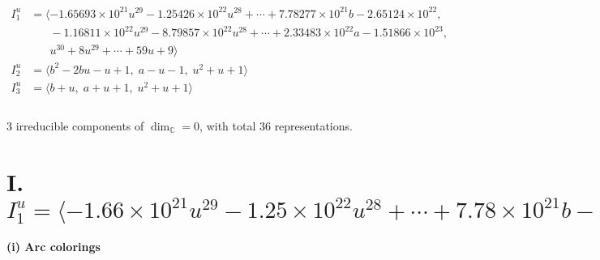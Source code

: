 \documentclass[1p]{elsarticle_modified}
\theoremstyle{definition}
\begin{document}
\begin{align*}
I^u_{1}&=\langle 
-1.65693\times10^{21} u^{29}-1.25426\times10^{22} u^{28}+\cdots+7.78277\times10^{21} b-2.65124\times10^{22},\\
\phantom{I^u_{1}}&\phantom{= \langle  }-1.16811\times10^{22} u^{29}-8.79857\times10^{22} u^{28}+\cdots+2.33483\times10^{22} a-1.51866\times10^{23},\\
\phantom{I^u_{1}}&\phantom{= \langle  }u^{30}+8 u^{29}+\cdots+59 u+9\rangle \\
I^u_{2}&=\langle 
b^2-2 b u- u+1,\;a- u-1,\;u^2+u+1\rangle \\
I^u_{3}&=\langle 
b+u,\;a+u+1,\;u^2+u+1\rangle \\
\\
\end{align*}
\raggedright * 3 irreducible components of $\dim_{\mathbb{C}}=0$, with total 36 representations.\\
\newpage
\renewcommand{\arraystretch}{1}
\centering \section*{I. $I^u_{1}= \langle -1.66\times10^{21} u^{29}-1.25\times10^{22} u^{28}+\cdots+7.78\times10^{21} b-2.65\times10^{22},\;-1.17\times10^{22} u^{29}-8.80\times10^{22} u^{28}+\cdots+2.33\times10^{22} a-1.52\times10^{23},\;u^{30}+8 u^{29}+\cdots+59 u+9 \rangle$}
\flushleft \textbf{(i) Arc colorings}\\
\end{document}
